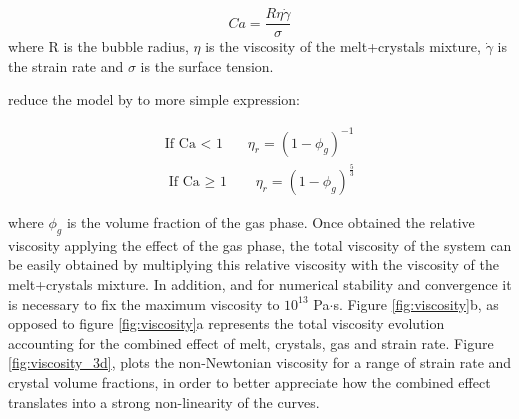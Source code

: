 \begin{equation}
	Ca = \frac{R\eta\dot{\gamma}}{\sigma}
\end{equation}
where R is the bubble radius, $\eta$ is the viscosity of the melt+crystals mixture, $\dot{\gamma}$ is the strain rate and $\sigma$ is the surface tension.

\cite{llewellin2005} reduce the model by \cite{pal2003} to more simple expression: 

\begin{equation}
	\begin{aligned}
		\text{If Ca < 1} \ \ \ \ \ \ \ \ \eta_r=(1-\phi_g)^{-1} \\
		\text{If Ca $\geq$ 1} \ \ \ \ \ \ \ \ \eta_r=(1-\phi_g)^{\frac{5}{3}}
	\end{aligned}
\end{equation}

where $\phi_g$ is the volume fraction of the gas phase. 
Once obtained the relative viscosity applying the effect of the gas phase, the total viscosity of the system can be easily obtained by multiplying this relative viscosity with the viscosity of the melt+crystals mixture. In addition, and for numerical stability and convergence it is necessary to fix the maximum viscosity to $10^{13}$ Pa$\cdot$s. Figure \ref{fig:viscosity}b, as opposed to figure \ref{fig:viscosity}a represents the total viscosity evolution accounting for the combined effect of melt, crystals, gas and strain rate. Figure \ref{fig:viscosity_3d}, plots the non-Newtonian viscosity for a range of strain rate and crystal volume fractions, in order to better appreciate how the combined effect translates into a strong non-linearity of the curves.




